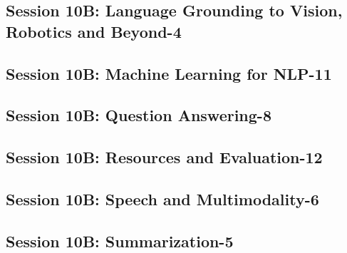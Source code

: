 \subsection{\large Session 10B: Language Grounding to Vision, Robotics and Beyond-4}
\label{parallel-session-10B-trackD}
\TrackDLoc\hfill\sessionchair{}{}
\clearpage
\subsection{\large Session 10B: Machine Learning for NLP-11}
\label{parallel-session-10B-trackE}
\TrackELoc\hfill\sessionchair{}{}
\clearpage
\subsection{\large Session 10B: Question Answering-8}
\label{parallel-session-10B-trackF}
\TrackFLoc\hfill\sessionchair{}{}
\clearpage
\subsection{\large Session 10B: Resources and Evaluation-12}
\label{parallel-session-10B-trackG}
\TrackGLoc\hfill\sessionchair{}{}
\clearpage
\subsection{\large Session 10B: Speech and Multimodality-6}
\label{parallel-session-10B-trackH}
\TrackHLoc\hfill\sessionchair{}{}
\clearpage
\subsection{\large Session 10B: Summarization-5}
\label{parallel-session-10B-trackI}
\TrackILoc\hfill\sessionchair{}{}
\clearpage


